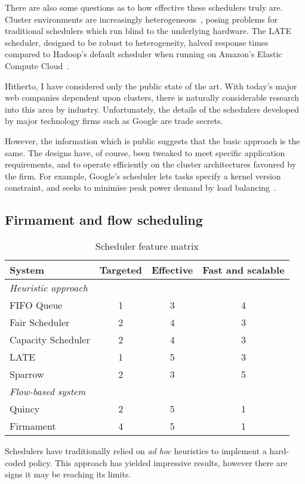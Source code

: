 There are also some questions as to how effective these schedulers truly are. Cluster environments are increasingly heterogeneous~\cite{Reiss:2012}, posing problems for traditional schedulers which run blind to the underlying hardware. The LATE scheduler, designed to be robust to heterogeneity, halved response times compared to Hadoop's default scheduler when running on Amazon's Elastic Compute Cloud~\cite{Zaharia:2008}.

Hitherto, I have considered only the public state of the art. With today's major web companies dependent upon clusters, there is naturally considerable research into this area by industry. Unfortunately, the details of the schedulers developed by major technology firms such as Google are trade secrets.

However, the information which is public suggests that the basic approach is the same. The designs have, of course, been tweaked to meet specific application requirements, and to operate efficiently on the cluster architectures favoured by the firm. For example, Google's scheduler lets tasks specify a kernel version constraint, and seeks to minimise peak power demand by load balancing~\cite[\S2.1]{Sharma:2011}.

\subsection{Firmament and flow scheduling}


\begin{table}
\begin{tabular}{lccc}
    \textbf{System} & \textbf{Targeted} & \textbf{Effective} & \textbf{Fast and scalable} \tabularnewline
    \hline
    \textit{Heuristic approach} \tabularnewline
    FIFO Queue & 1 & 3 & 4 \tabularnewline
    Fair Scheduler & 2 & 4 & 3 \tabularnewline 
    Capacity Scheduler & 2 & 4 & 3 \tabularnewline 
    LATE & 1 & 5 & 3 \tabularnewline 
    Sparrow & 2 & 3 & 5 \tabularnewline 
    \hline
    \textit{Flow-based system} \tabularnewline
    Quincy & 2 & 5 & 1 \tabularnewline 
    Firmament & 4 & 5 & 1 \tabularnewline 
    \hline
\end{tabular}
\caption{Scheduler feature matrix}
\label{table:cluster-scheduler-feature-matrix}
\end{table}

Schedulers have traditionally relied on \textit{ad hoc} heuristics to implement a hard-coded policy. This approach has yielded impressive results, however there are signs it may be reaching its limits.

